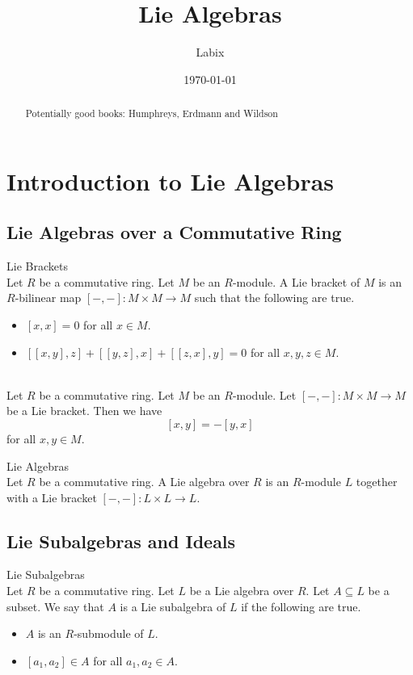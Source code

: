 \documentclass[a4paper]{article}
\title{Lie Algebras}
\author{Labix}
\date{\today}
\begin{document}
\maketitle
\begin{abstract}
Potentially good books: Humphreys, Erdmann and Wildson
\end{abstract}
\pagebreak
\tableofcontents
\pagebreak

\section{Introduction to Lie Algebras}
\subsection{Lie Algebras over a Commutative Ring}
\begin{defn}{Lie Brackets}{}\\
Let $R$ be a commutative ring. Let $M$ be an $R$-module. A Lie bracket of $M$ is an $R$-bilinear map $[-,-]:M\times M\to M$ such that the following are true. 
\begin{itemize}
\item $[x,x]=0$ for all $x\in M$. 
\item $[[x,y],z]+[[y,z],x]+[[z,x],y]=0$ for all $x,y,z\in M$. 
\end{itemize}
\end{defn}

\begin{lmm}{}{}\\
Let $R$ be a commutative ring. Let $M$ be an $R$-module. Let $[-,-]:M\times M\to M$ be a Lie bracket. Then we have $$[x,y]=-[y,x]$$ for all $x,y\in M$. 
\end{lmm}

\begin{defn}{Lie Algebras}{}\\
Let $R$ be a commutative ring. A Lie algebra over $R$ is an $R$-module $L$ together with a Lie bracket $[-,-]:L\times L\to L$. 
\end{defn}

\subsection{Lie Subalgebras and Ideals}
\begin{defn}{Lie Subalgebras}{}\\
Let $R$ be a commutative ring. Let $L$ be a Lie algebra over $R$. Let $A\subseteq L$ be a subset. We say that $A$ is a Lie subalgebra of $L$ if the following are true. 
\begin{itemize}
\item $A$ is an $R$-submodule of $L$. 
\item $[a_1,a_2]\in A$ for all $a_1,a_2\in A$. 
\end{itemize}
\end{defn}
\end{document}
